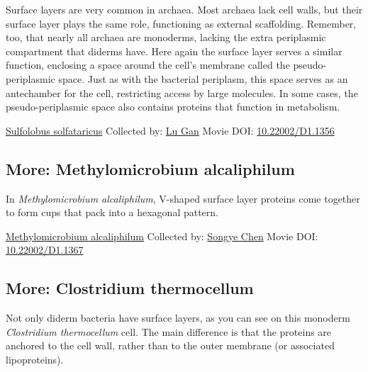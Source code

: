 \documentclass[]{tufte-book}
\begin{document}
Surface layers are very common in archaea. Most archaea lack cell walls, but their surface layer plays the same role, functioning as external scaffolding. Remember, too, that nearly all archaea are monoderms, lacking the extra periplasmic compartment that diderms have. Here again the surface layer serves a similar function, enclosing a space around the cell's membrane called the pseudo-periplasmic space. Just as with the bacterial periplasm, this space serves as an antechamber for the cell, restricting access by large molecules. In some cases, the pseudo-periplasmic space also contains proteins that function in metabolism.



\hypertarget{htmlwidget-1289a44eabacfe7097ef}{}

\label{fig:2-7}\protect\hyperlink{tree}{Sulfolobus solfataricus} Collected by: \protect\hyperlink{lu_gan}{Lu Gan} Movie DOI: \href{https://doi.org/10.22002/D1.1356}{10.22002/D1.1356}

\hypertarget{Methylomicrobium_alcaliphilum}{%
\subsection*{More: Methylomicrobium alcaliphilum}\label{Methylomicrobium_alcaliphilum}}

In \emph{Methylomicrobium alcaliphilum}, V-shaped surface layer proteins come together to form cups that pack into a hexagonal pattern.



\hypertarget{htmlwidget-13cbd05ab10a0606eada}{}

\label{fig:2-7a}\protect\hyperlink{tree}{Methylomicrobium alcaliphilum} Collected by: \protect\hyperlink{songye_chen}{Songye Chen} Movie DOI: \href{https://doi.org/10.22002/D1.1367}{10.22002/D1.1367}

\hypertarget{Clostridium_thermocellum}{%
\subsection*{More: Clostridium thermocellum}\label{Clostridium_thermocellum}}

Not only diderm bacteria have surface layers, as you can see on this monoderm \emph{Clostridium thermocellum} cell. The main difference is that the proteins are anchored to the cell wall, rather than to the outer membrane (or associated lipoproteins).
\end{document}

